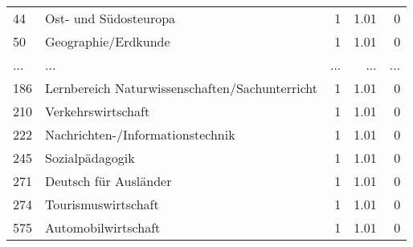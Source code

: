 \begin{longtable}{lXrrr}
        44 & \multicolumn{1}{X}{Ost- und Südosteuropa} & %
          \num{1} &
          \num[round-mode=places,round-precision=2]{1,01} &
          \num[round-mode=places,round-precision=2]{0} \\
        50 & \multicolumn{1}{X}{Geographie/Erdkunde} & %
          \num{1} &
          \num[round-mode=places,round-precision=2]{1,01} &
          \num[round-mode=places,round-precision=2]{0} \\
       ... & ... & ... & ... & ... \\
        186 & \multicolumn{1}{X}{Lernbereich Naturwissenschaften/Sachunterricht} & %
          \num{1} &
          \num[round-mode=places,round-precision=2]{1,01} &
          \num[round-mode=places,round-precision=2]{0} \\

        210 & \multicolumn{1}{X}{Verkehrswirtschaft} & %
          \num{1} &
          \num[round-mode=places,round-precision=2]{1,01} &
          \num[round-mode=places,round-precision=2]{0} \\

        222 & \multicolumn{1}{X}{Nachrichten-/Informationstechnik} & %
          \num{1} &
          \num[round-mode=places,round-precision=2]{1,01} &
          \num[round-mode=places,round-precision=2]{0} \\

        245 & \multicolumn{1}{X}{Sozialpädagogik} & %
          \num{1} &
          \num[round-mode=places,round-precision=2]{1,01} &
          \num[round-mode=places,round-precision=2]{0} \\

        271 & \multicolumn{1}{X}{Deutsch für Ausländer} & %
          \num{1} &
          \num[round-mode=places,round-precision=2]{1,01} &
          \num[round-mode=places,round-precision=2]{0} \\

        274 & \multicolumn{1}{X}{Tourismuswirtschaft} & %
          \num{1} &
          \num[round-mode=places,round-precision=2]{1,01} &
          \num[round-mode=places,round-precision=2]{0} \\

        575 & \multicolumn{1}{X}{Automobilwirtschaft} & %
          \num{1} &
          \num[round-mode=places,round-precision=2]{1,01} &
          \num[round-mode=places,round-precision=2]{0} \\


\end{longtable}
